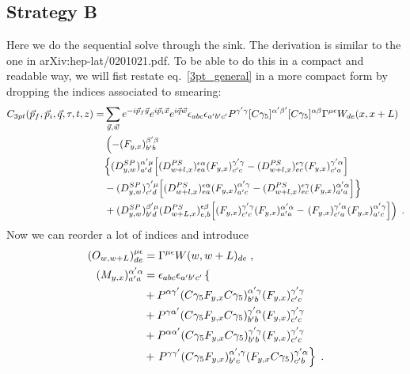 \documentclass[a4paper,10pt]{scrartcl}
\begin{document}
\subsection{Strategy B}
Here we do the sequential solve through the sink. The derivation is similar to the one in arXiv:hep-lat/0201021.pdf. To be able to do this in a compact and readable way, we will fist restate eq.~\eqref{3pt_general} in a more compact form
by dropping the indices associated to smearing:
\begin{align}
    C_{3pt}(\vec p_f, \vec p_i, \vec q, \tau, t, z) =& \sum_{\vec y, \vec w} e^{-i \vec p_f \vec y} e^{i \vec p_i \vec x} e^{i \vec q \vec w} \epsilon_{abc} \epsilon_{a'b'c'} \notag
    P^{\gamma' \gamma} [C \gamma_5]^{\alpha' \beta'} [C \gamma_5]^{\alpha \beta} \Gamma^{\mu \epsilon} W_{de}(x, x+L) \notag \\
    & \left( -(F_{y,x})^{\beta' \beta}_{b'b} \right. \notag \\
    &\Big\lbrace (D^{SP}_{y,w})^{\alpha' \mu}_{a'd} \Big[ (D^{PS}_{w+l,x})^{\epsilon \alpha}_{ea} (F_{y,x})^{\gamma' \gamma}_{c'c}
     - (D^{PS}_{w+l,x})^{\epsilon \gamma}_{ec} (F_{y,x})^{\gamma' \alpha}_{c'a} \Big] \label{3pt_short}\\
    & -(D^{SP}_{y,w})^{\gamma' \mu}_{c'd} \Big[ (D^{PS}_{w+l,x})^{\epsilon \alpha}_{ea} (F_{y,x})^{\alpha' \gamma}_{a'c}
     - (D^{PS}_{w+l,x})^{\epsilon \gamma}_{ec} (F_{y,x})^{\alpha' \alpha}_{a'a} \Big] \Big \rbrace\notag \\
    & + (D^{SP}_{y,w})^{\beta'\mu}_{b'd} (D^{PS}_{w+L,x})^{\epsilon \beta}_{e,b} \Big[ (F_{y,x})^{\gamma' \gamma}_{c'c}
    (F_{y,x})^{\alpha' \alpha}_{a'a}
     - \left. (F_{y,x})^{\gamma' \alpha}_{c'a} (F_{y,x})^{\alpha' \gamma}_{a'c} \Big] \right) \notag \; .
\end{align}
Now we can reorder a lot of indices and introduce
\begin{align}
    (O_{w,w+L})^{\mu \epsilon}_{de} &= \Gamma^{\mu \epsilon} W(w,w+L)_{de} \; , \\ 
    (M_{y,x})^{\alpha' \alpha}_{a'a} &= \epsilon_{abc} \epsilon_{a'b'c'} \left \lbrace \notag \right. \\
    &+ P^{\alpha \gamma'} (C\gamma_5 F_{y,x} C\gamma_5)^{\alpha' \gamma}_{b'b} (F_{y,x})^{\gamma' \gamma}_{c'c} \notag \\
    &+ P^{\gamma \alpha'} (C\gamma_5 F_{y,x} C\gamma_5)^{\gamma' \alpha}_{b'b} (F_{y,x})^{\gamma' \gamma}_{c'c} \\
    &+ P^{\alpha \alpha'} (C\gamma_5 F_{y,x} C\gamma_5)^{\gamma' \gamma}_{b'b} (F_{y,x})^{\gamma' \gamma}_{c'c}
    \notag \\
    &+ \left. P^{\gamma \gamma'} (C\gamma_5F_{y,x})^{\alpha', \gamma}_{b'c} (F_{y,x}C\gamma_5)^{\gamma' \alpha}_{c'b} \right \rbrace \; . \notag
\end{align}
\end{document}

